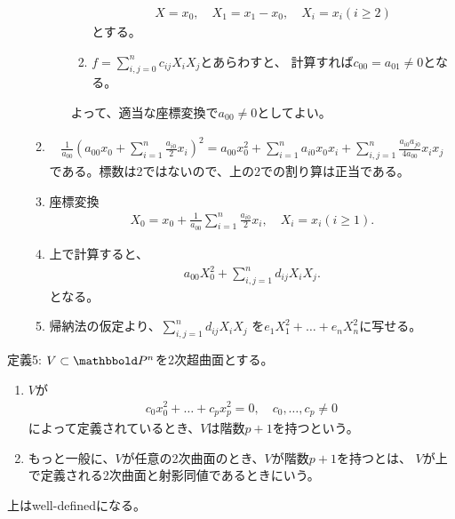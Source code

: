 \begin{myproof}
\begin{enumerate}
\begin{enumerate}
\begin{enumerate}
\begin{enumerate}
\begin{align}
            X = x_0,\quad X_1 = x_1-x_0,\quad X_i = x_i (i\ge 2)
          \end{align}
          とする。
          \item
          $f = \sum_{i,j=0}^n c_{ij}X_i X_j$とあらわすと、
          計算すれば$c_{00} = a_{01}\neq 0$となる。
        \end{enumerate}
        よって、適当な座標変換で$a_{00} \neq 0$としてよい。
      \end{enumerate}
      \item
      \begin{align}
        \frac{1}{a_{00}}(a_{00}x_0 + \sum_{i=1}^n \frac{a_{i0}}{2}x_i)^2
        =
        a_{00}x_0^2 + \sum_{i=1}^n a_{i0}x_0 x_i
        +
        \sum_{i,j=1}^n \frac{a_{i0}a_{j0}}{4a_{00}}x_i x_j
      \end{align}
      である。標数は2ではないので、上の2での割り算は正当である。
      \item
      座標変換
      \begin{align}
        X_0 = x_0 + \frac{1}{a_{00}}\sum_{i=1}^n \frac{a_{i0}}{2}x_i,\quad
        X_i = x_i (i\ge 1).
      \end{align}
      \item
      上で計算すると、
      \begin{align}
        a_{00}X_0^2 + \sum_{i,j=1}^n d_{ij}X_i X_j.
      \end{align}
      となる。
      \item
      帰納法の仮定より、$\sum_{i,j=1}^n d_{ij}X_i X_j$
      を$e_1 X_1^2 + \dots + e_n X_n^2$に写せる。
    \end{enumerate}
  \end{enumerate}
\end{myproof}

\begin{framed}
  定義5:
  $V\subset \P^n$を2次超曲面とする。
  \begin{enumerate}[label=(\roman*)]
    \item $V$が
    \begin{align}
      c_0 x_0^2 + \dots + c_p x_p^2 = 0,\quad c_0,\dots,c_p \neq 0
    \end{align}
    によって定義されているとき、$V$は階数$p+1$を持つという。
    \item
    もっと一般に、$V$が任意の2次曲面のとき、$V$が階数$p+1$を持つとは、
    $V$が上で定義される2次曲面と射影同値であるときにいう。
  \end{enumerate}
\end{framed}
上はwell-definedになる。

